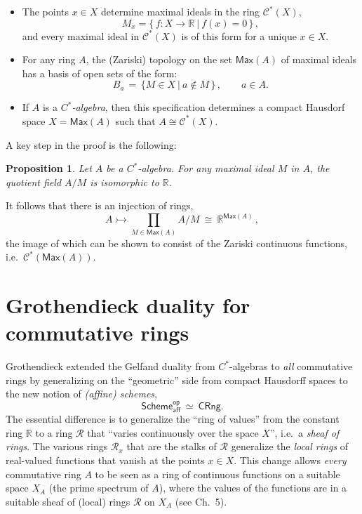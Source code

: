 \documentclass[12pt]{article}
\newcommand{\mono}{\ensuremath{\rightarrowtail}}
\newtheorem*{theorem*}{Theorem}
\newtheorem*{proposition*}{Proposition}
\theoremstyle{remark}
\theoremstyle{definition}
\begin{document}
\begin{itemize}
\item The points  $x\in X$ determine maximal ideals in the ring $\mathcal{C}^*(X)$,
\[
M_x = \{\, f : X\to \mathbb{R}\ |\ f(x) = 0\, \}\,,
\]
and every maximal ideal in $\mathcal{C}^*(X)$ is of this form for a unique $x\in X$.

\item For any ring $A$, the (Zariski) topology on the set $\mathsf{Max}(A)$ of maximal ideals has a basis of open sets of the form:
\[
B_a\, =\, \{M \in X\ |\ a\notin M\, \}\, ,\qquad a\in A.
\]

\item If $A$ is a \emph{$C^*$-algebra}, then this specification  determines a compact Hausdorf space $X = \mathsf{Max}(A)$ such that $A\cong \mathcal{C}^*(X)$.
\end{itemize}

A key step in the proof is the following:
%
 \begin{proposition*}
 Let $A$ be a $C^*$-algebra.  For any maximal ideal $M$ in $A$, the quotient field 
 $A/M$ is isomorphic to  $\mathbb{R}$. 
    \end{proposition*}
%   
It follows that there is an injection of rings,
$$A \mono \prod_{M\in \mathsf{Max}(A)}\!\!A/M\ \cong\ \mathbb{R}^{\mathsf{Max}(A)}\,,$$
the image of which  can be shown to consist of the Zariski continuous functions, i.e.\  $\mathcal{C}^*(\mathsf{Max}(A))$.



\section{Grothendieck duality for commutative rings}

Grothendieck extended the Gelfand duality from $C^*$-algebras to \emph{all} commutative rings by generalizing on the ``geometric'' side from compact Hausdorff spaces to the new notion of \emph{(affine) schemes},
 \[
\mathsf{Scheme}_\mathsf{aff}^\mathsf{op}\ \simeq\ \mathsf{CRng}.
 \]
The essential difference is to generalize the ``ring of values'' from the constant ring $\mathbb{R}$ to a ring $\mathcal{R}$ that ``varies continuously over the space $X$'', i.e.\ a \emph{sheaf of rings}.   
The various rings $\mathcal{R}_x$ that are the stalks of $\mathcal{R}$ generalize the \emph{local rings} of real-valued functions that vanish at the points $x\in X$.
This change allows \emph{every} commutative ring $A$ to be seen as a ring of continuous functions on a suitable space $X_A$ (the prime spectrum of $A$), where the values of the functions are in a suitable sheaf of (local) rings $\mathcal{R}$ on $X_A$ (see \cite{J} Ch.~5).
\end{document}
